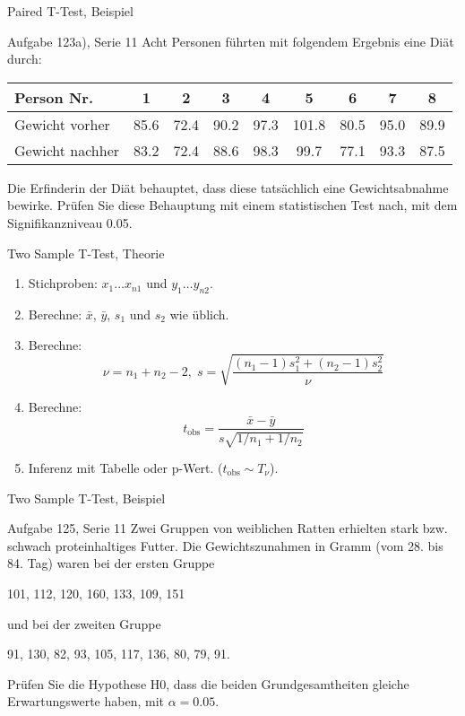 \documentclass{beamer}
\begin{document}
\begin{frame}{Paired T-Test, Beispiel}
\begin{beamerboxesrounded}[shadow]{Aufgabe 123a), Serie 11}
Acht Personen führten mit folgendem Ergebnis eine Diät durch:

\vspace{2mm}\begin{center}{\scriptsize\begin{tabular}{l|cccccccc}
Person Nr.&1&2&3&4&5&6&7&8\\\hline
Gewicht vorher&85.6&72.4&90.2&97.3&101.8&80.5&95.0&89.9\\
Gewicht nachher&83.2&72.4&88.6&98.3&99.7&77.1&93.3&87.5\\
\end{tabular}}\end{center}\vspace{2mm}

Die Erfinderin der Diät behauptet, dass diese tatsächlich eine Gewichtsabnahme
bewirke. Prüfen Sie diese Behauptung mit einem statistischen Test nach, mit
dem Signifikanzniveau 0.05.
\end{beamerboxesrounded}
\end{frame}

\begin{frame}{Two Sample T-Test, Theorie}
\begin{enumerate}
\item Stichproben: $x_1\ldots x_{n1}$ und $y_1\ldots y_{n2}$.
\item Berechne: $\bar{x}$, $\bar{y}$, $s_1$ und $s_2$ wie üblich.
\item Berechne: 
$$
\nu=n_1+n_2-2,\;
s=\sqrt{\frac{(n_1-1)s_1^2+(n_2-1)s_2^2}{\nu}}
$$

\item Berechne:
$$
t_\text{obs}=\frac{\bar{x}-\bar{y}}{s\sqrt{1/n_1+1/n_2}}
$$
\item Inferenz mit Tabelle oder p-Wert. ($t_\text{obs}\sim T_\nu$).
\end{enumerate}
\end{frame}

\begin{frame}{Two Sample T-Test, Beispiel}
\begin{beamerboxesrounded}[shadow]{Aufgabe 125, Serie 11}
Zwei Gruppen von weiblichen Ratten erhielten stark bzw. schwach proteinhaltiges Futter.
Die Gewichtszunahmen in Gramm (vom 28. bis 84. Tag) waren bei der ersten Gruppe
\begin{center}101, 112, 120, 160, 133, 109, 151\end{center}
und bei der zweiten Gruppe
\begin{center}91, 130, 82, 93, 105, 117, 136, 80, 79, 91.\end{center}

Prüfen Sie die Hypothese H0, dass die beiden Grundgesamtheiten gleiche
Erwartungswerte haben, mit $\alpha = 0.05$.
\end{beamerboxesrounded}
\end{frame}
\end{document}
